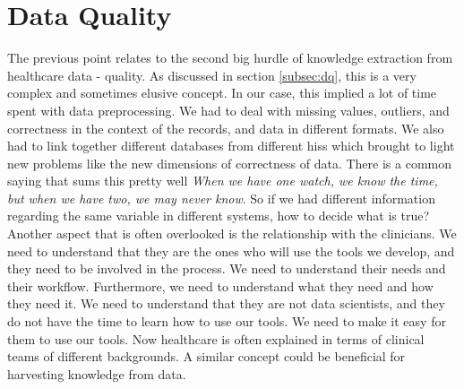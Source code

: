\section{Data Quality}

The previous point relates to the second big hurdle of knowledge extraction from healthcare data - quality. As discussed in section \ref{subsec:dq}, this is a very complex and sometimes elusive concept. In our case, this implied a lot of time spent with data preprocessing. We had to deal with missing values, outliers, and correctness in the context of the records, and data in different formats. We also had to link together different databases from different \acp{his} which brought to light new problems like the new dimensions of correctness of data. There is a common saying that sums this pretty well \textit{When we have one watch, we know the time, but when we have two, we may never know}. So if we had different information regarding the same variable in different systems, how to decide what is true?
Another aspect that is often overlooked is the relationship with the clinicians. We need to understand that they are the ones who will use the tools we develop, and they need to be involved in the process. We need to understand their needs and their workflow. Furthermore, we need to understand what they need and how they need it. We need to understand that they are not data scientists, and they do not have the time to learn how to use our tools. We need to make it easy for them to use our tools. Now healthcare is often explained in terms of clinical teams of different backgrounds. A similar concept could be beneficial for harvesting knowledge from data.



